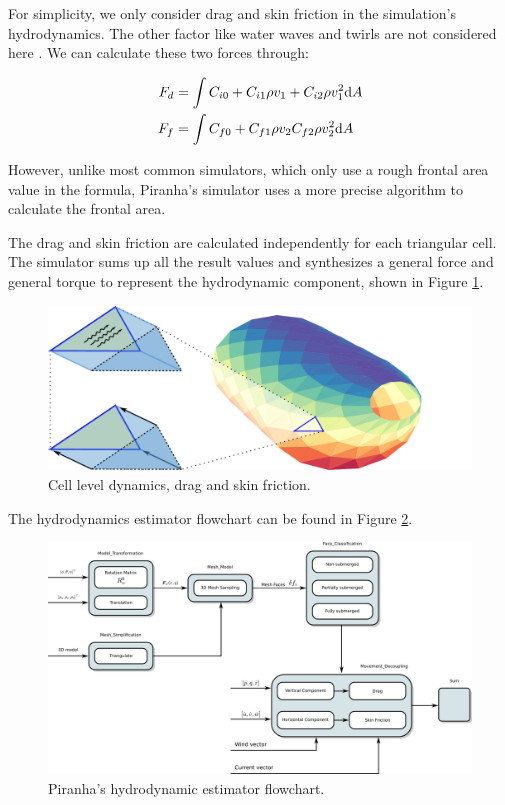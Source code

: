 For simplicity, we only consider drag and skin friction in the simulation's hydrodynamics. The other factor like water waves and twirls are not considered here \cite{tian2015dynamic}. We can calculate these two forces through:

\begin{equation}
\begin{split}
    F_d &= \int C_{i0}+ C_{i1} \rho v_1 + C_{i2} \rho v_1^2  {\rm d} A \\
    F_f &= \int C_{f0}+ C_{f1} \rho v_2 C_{f2} \rho v_2^2 {\rm d} A
\end{split}
\end{equation}

However, unlike most common simulators, which only use a rough frontal area value in the formula, Piranha's simulator uses a more precise algorithm to calculate the frontal area.

The drag and skin friction are calculated independently for each triangular cell. The simulator sums up all the result values and synthesizes a general force and general torque to represent the hydrodynamic component, shown in Figure \ref{fig:04orca_surf}.

\begin{figure}
    \centering
    \includegraphics[width=.8\textwidth]{images/04orca_surf.pdf}
    \caption{Cell level dynamics, drag and skin friction.}
    \label{fig:04orca_surf}
\end{figure}

The hydrodynamics estimator flowchart can be found in Figure \ref{fig:04hydrodynamic-flowchart}.

\begin{figure}
    \centering
    \includegraphics[width=\textwidth]{images/04hydrodynamics_flowchart.pdf}
    \caption{Piranha's hydrodynamic estimator flowchart.}
    \label{fig:04hydrodynamic-flowchart}
\end{figure}

